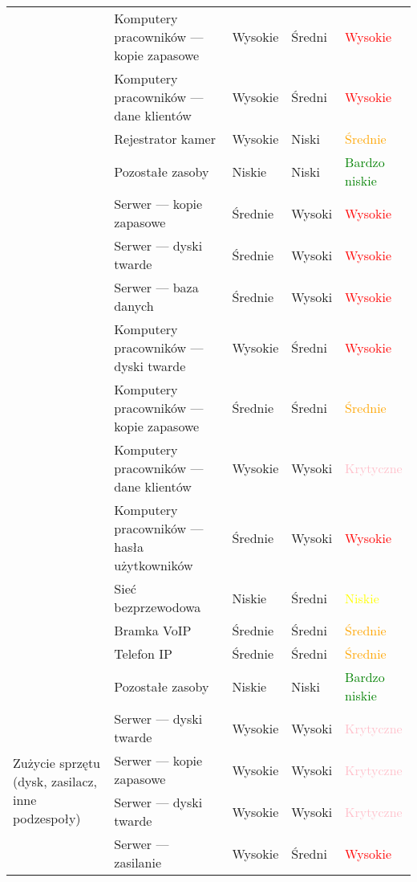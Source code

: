 \begin{landscape}
\begin{longtable}[ht!]{|m{4cm}|m{6cm}|m{4.5cm}|m{3cm}|m{3cm}|}
		& Komputery pracowników --- kopie zapasowe & Wysokie & Średni & \textcolor{red}{Wysokie} \\ \cline{2-5}
		& Komputery pracowników --- dane klientów & Wysokie & Średni & \textcolor{red}{Wysokie} \\ \cline{2-5}
		& Rejestrator kamer & Wysokie & Niski & \textcolor{orange}{Średnie} \\ \cline{2-5}
		& Pozostałe zasoby & Niskie & Niski & \textcolor{green}{Bardzo niskie} \\ \cline{2-5}
	\hline 
	\newpage
	\hline
	\multirow{11}{4cm}{Szkodliwe oprogramowanie} 
		& Serwer --- kopie zapasowe & Średnie & Wysoki & \textcolor{red}{Wysokie} \\ \cline{2-5}
		& Serwer --- dyski twarde & Średnie & Wysoki & \textcolor{red}{Wysokie} \\ \cline{2-5}
		& Serwer --- baza danych & Średnie & Wysoki & \textcolor{red}{Wysokie} \\ \cline{2-5}
		& Komputery pracowników --- dyski twarde & Wysokie & Średni & \textcolor{red}{Wysokie} \\ \cline{2-5}
		& Komputery pracowników --- kopie zapasowe & Średnie & Średni & \textcolor{orange}{Średnie} \\ \cline{2-5}
		& Komputery pracowników --- dane klientów & Wysokie & Wysoki & \textcolor{pink}{Krytyczne} \\ \cline{2-5}
		& Komputery pracowników --- hasła użytkowników & Średnie & Wysoki & \textcolor{red}{Wysokie} \\ \cline{2-5}
		& Sieć bezprzewodowa & Niskie & Średni & \textcolor{yellow}{Niskie} \\ \cline{2-5}
		& Bramka VoIP & Średnie & Średni & \textcolor{orange}{Średnie} \\ \cline{2-5}
		& Telefon IP & Średnie & Średni & \textcolor{orange}{Średnie} \\ \cline{2-5}
		& Pozostałe zasoby & Niskie & Niski & \textcolor{green}{Bardzo niskie} \\ \cline{2-5}
	\hline
 	\multirow{6}{4cm}{Zużycie sprzętu (dysk, zasilacz, inne podzespoły)}
 		& Serwer --- dyski twarde & Wysokie & Wysoki & \textcolor{pink}{Krytyczne} \\ \cline{2-5}
 		& Serwer --- kopie zapasowe & Wysokie & Wysoki & \textcolor{pink}{Krytyczne} \\ \cline{2-5}
 		& Serwer --- dyski twarde & Wysokie & Wysoki & \textcolor{pink}{Krytyczne} \\ \cline{2-5}
 		& Serwer --- zasilanie & Wysokie &Średni & \textcolor{red}{Wysokie} \\ \cline{2-5}

\end{longtable}
\end{landscape}
